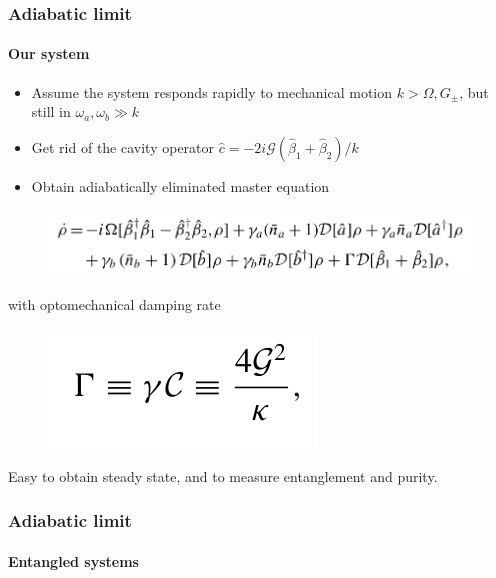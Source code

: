 \documentclass[aspectratio=43]{beamer}
\begin{document}
\begin{frame}
	
	\frametitle{Adiabatic limit}
	\framesubtitle{Our system}
	
	\begin{itemize}
		\item Assume the system responds rapidly to mechanical motion $k > \Omega, G_{\pm}$, but still in $\omega_{a}, \omega_{b} \gg k$
		\item Get rid of the cavity operator $\hat{c} = -2i\mathcal{G}(\hat{\beta}_{1} + \hat{\beta}_{2})/k$\\
		\item Obtain adiabatically eliminated master equation
	\end{itemize}

	\begin{figure}
		\includegraphics[width = 9 cm]{plots/master_eq_2.png}
	\end{figure}

	with optomechanical damping rate
	\begin{figure}
		\includegraphics[width = 3 cm]{plots/optomechanic_dumping.png}
	\end{figure}

	Easy to obtain steady state, and to measure entanglement and purity.
	 
\end{frame}

\begin{frame}

	\frametitle{Adiabatic limit}
	\framesubtitle{Entangled systems}

\end{frame}
\end{document}
